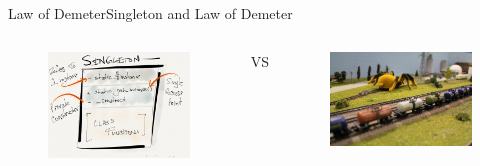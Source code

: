 \documentclass[10pt]{beamer}
\begin{document}
\begin{frame}{Law of Demeter}{Singleton and Law of Demeter}
  \begin{columns}[T]
      \begin{column}{.5\textwidth}
    \begin{figure}[overview]
      \includegraphics[width=1\textwidth]{images/singleton.png}
    \end{figure}
      \end{column}
       \hfill
      VS
      \begin{column}{.5\textwidth}
    \begin{figure}[train]
      \includegraphics[width=1\textwidth]{images/demeter_train.jpg}
    \end{figure}
      \end{column}
    \end{columns}
\end{frame}
\end{document}
